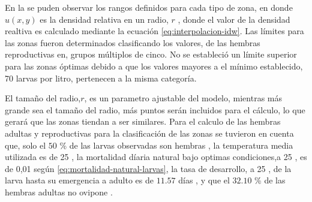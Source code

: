 En la  se puden observar los rangos definidos para cada tipo de
zona, en donde $u(x,y)$ es la densidad relativa en un radio, $r$ , donde el valor de la densidad
realtiva es calculado mediante la ecuación \eqref{eq:interpolacion-idw}. Las límites para las
zonas fueron determinados clasificando los valores, de las hembras reproductivas en, grupos
múltiplos de cinco. No se estableció  un límite superior para las zonas óptimas debido a que los
valores mayores a el mínimo establecido, 70 larvas por litro, pertenecen a la misma categoría.

El tamaño del radio,$r$, es un parametro ajustable del modelo, mientras más grande sea el tamaño
del radio, más puntos serán incluidos para el cálculo, lo que gerará que las zonas tiendan a ser
similares. Para el calculo de las hembras adultas y reproductivas para la clasificación de las zonas se tuvieron en cuenta que, solo el $50$ \% de las larvas observadas son hembras
\cite{otero2006stochastic, manrique1998desarrollo}, la temperatura media utilizada es de 25
\textcelsius \cite{website:mspbsHistoria2014}, la mortalidad díaria natural bajo optimas
condiciones,a 25 \textcelsius, es de 0,01 según \eqref{eq:mortalidad-natural-larvas}, la tasa de
desarrollo, a 25 \textcelsius, de la larva hasta su emergencia a adulto es de $11.57$ días
\cite{rueda1990temperature}, y que el $32.10$ \% de las hembras adultas no ovipone
\citep{osoriopontificia}.
